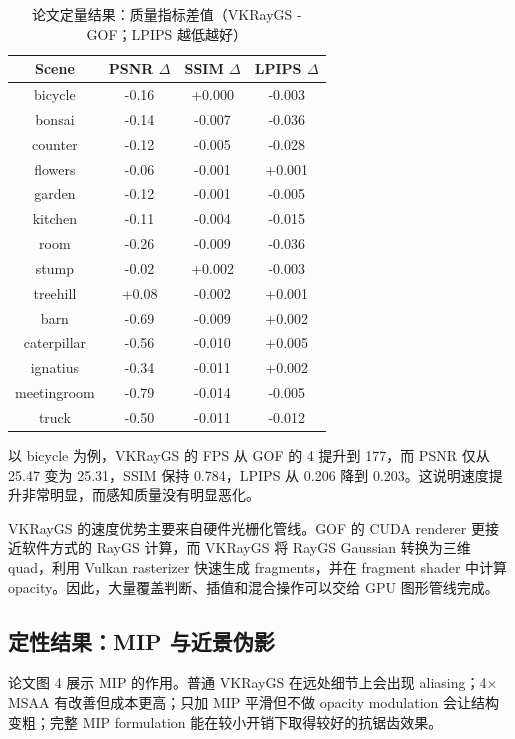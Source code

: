 \documentclass[12pt,hyperref,a4paper,UTF8]{ctexart}
\begin{document}
\begin{table}[H]
    \centering
    \caption{论文定量结果：质量指标差值（VKRayGS - GOF；LPIPS 越低越好）}
    \label{tab:paper_quality_delta}
    \setlength{\tabcolsep}{20pt}
    \renewcommand{\arraystretch}{1.15}
    \begin{tabular}{cccc}
        \bottomrule[1.5pt]
        \textbf{Scene} & \textbf{PSNR $\Delta$} & \textbf{SSIM $\Delta$} & \textbf{LPIPS $\Delta$} \\
        \midrule[0.5pt]
        bicycle & -0.16 & +0.000 & -0.003 \\
        bonsai & -0.14 & -0.007 & -0.036 \\
        counter & -0.12 & -0.005 & -0.028 \\
        flowers & -0.06 & -0.001 & +0.001 \\
        garden & -0.12 & -0.001 & -0.005 \\
        kitchen & -0.11 & -0.004 & -0.015 \\
        room & -0.26 & -0.009 & -0.036 \\
        stump & -0.02 & +0.002 & -0.003 \\
        treehill & +0.08 & -0.002 & +0.001 \\
        barn & -0.69 & -0.009 & +0.002 \\
        caterpillar & -0.56 & -0.010 & +0.005 \\
        ignatius & -0.34 & -0.011 & +0.002 \\
        meetingroom & -0.79 & -0.014 & -0.005 \\
        truck & -0.50 & -0.011 & -0.012 \\
        \toprule[1.5pt]
    \end{tabular}
\end{table}

以 bicycle 为例，VKRayGS 的 FPS 从 GOF 的 4 提升到 177，而 PSNR 仅从 25.47 变为 25.31，SSIM 保持 0.784，LPIPS 从 0.206 降到 0.203。这说明速度提升非常明显，而感知质量没有明显恶化。

VKRayGS 的速度优势主要来自硬件光栅化管线。GOF 的 CUDA renderer 更接近软件方式的 RayGS 计算，而 VKRayGS 将 RayGS Gaussian 转换为三维 quad，利用 Vulkan rasterizer 快速生成 fragments，并在 fragment shader 中计算 opacity。因此，大量覆盖判断、插值和混合操作可以交给 GPU 图形管线完成。



\subsection{定性结果：MIP 与近景伪影}
论文图 4 展示 MIP 的作用。普通 VKRayGS 在远处细节上会出现 aliasing；4$\times$ MSAA 有改善但成本更高；只加 MIP 平滑但不做 opacity modulation 会让结构变粗；完整 MIP formulation 能在较小开销下取得较好的抗锯齿效果。
\end{document}
